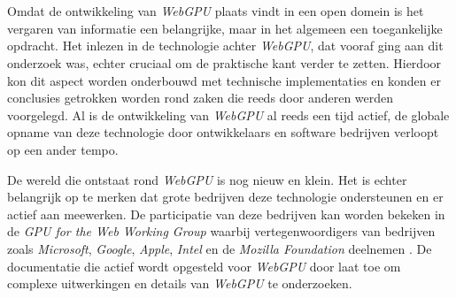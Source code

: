 
\chapter{}%
\label{ch:methodologie}


Omdat de ontwikkeling van \textit{WebGPU} plaats vindt in een open domein is het vergaren van informatie een belangrijke, maar in het algemeen een toegankelijke opdracht. Het inlezen in de technologie achter \textit{WebGPU}, dat vooraf ging aan dit onderzoek was, echter cruciaal om de praktische kant verder te zetten. Hierdoor kon dit aspect worden onderbouwd met technische implementaties en konden er conclusies getrokken worden rond zaken die reeds door anderen werden voorgelegd. Al is de ontwikkeling van \textit{WebGPU} al reeds een tijd actief, de globale opname van deze technologie door ontwikkelaars en software bedrijven verloopt op een ander tempo. 

\bigbreak{}

De wereld die ontstaat rond \textit{WebGPU} is nog nieuw en klein. Het is echter belangrijk op te merken dat grote bedrijven deze technologie ondersteunen en er actief aan meewerken. De participatie van deze bedrijven kan worden bekeken in de \textit{GPU for the Web Working Group} waarbij vertegenwoordigers van bedrijven zoals \textit{Microsoft}, \textit{Google}, \textit{Apple}, \textit{Intel} en de \textit{Mozilla Foundation} deelnemen \autocite{W3C2024a}. De documentatie die actief wordt opgesteld voor \textit{WebGPU} door \textcite{W3C2023} laat toe om complexe uitwerkingen en details van \textit{WebGPU} te onderzoeken. 

